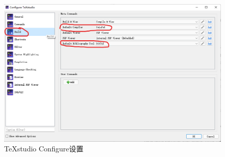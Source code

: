 \begin{figure}[htbp] 
	\centering
	\includegraphics[width=1\textwidth]{image/chap01/texstudio2.png}
	\caption{TeXstudio Configure设置}
	\label{fig:texstudio2}
\end{figure}